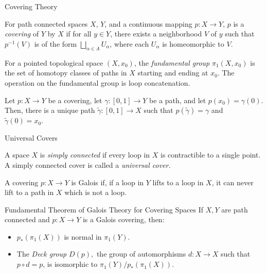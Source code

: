 \documentclass{beamer}
\begin{document}
\section{}
\begin{frame}{Covering Theory}
\begin{definition}[Covering]
For path connected spaces $X$, $Y$, and a continuous mapping $p:X\to Y$, $p$ is a \textit{covering} of $Y$ by $X$ if for all $y\in Y$, there exists a neighborhood $V$ of $y$ such that $p^{-1}(V)$ is of the form $\bigsqcup_{\alpha\in A} U_\alpha$, where each $U_\alpha$ is homeomorphic to $V.$  
\end{definition}
\begin{definition}
For a pointed topological space $(X, x_0)$, the \textit{fundamental group} $\pi_1(X, x_0)$ is the set of homotopy classes of paths in $X$ starting and ending at $x_0$. The operation on the fundamental group is loop concatenation. 
\end{definition}
\begin{theorem}
Let $p:X\to Y$ be a covering, let $\gamma: [0, 1]\to Y$ be a path, and let $p(x_0)=\gamma(0).$ Then, there is a unique path $\tilde{\gamma}: [0, 1]\to X$ such that $p(\tilde{\gamma})=\gamma$ and $\tilde{\gamma}(0)=x_0.$
\end{theorem}


    
\end{frame}
\begin{frame}{Universal Covers}
\begin{definitions}
A space $X$ is \textit{simply connected} if every loop in $X$ is contractible to a single point. A simply connected cover is called a \textit{universal cover.}
\end{definitions}
\begin{definition}
A covering $p:X\to Y$ is Galois if, if a loop in $Y$ lifts to a loop in $X$, it can never lift to a path in $X$ which is not a loop.
\end{definition}
\begin{block}{Fundamental Theorem of Galois Theory for Covering Spaces}
    If $X, Y$ are path connected and $p:X\to Y$ is a Galois covering, then:
    \begin{itemize}
        \item $p_*(\pi_1(X))$ is normal in $\pi_1(Y)$.
        \item The \textit{Deck group} $D(p),$ the group of automorphisms $d:X\to X$ such that $p\circ d=p$, is isomorphic to $\pi_1(Y)/p_*(\pi_1(X))$.
    \end{itemize}
\end{block}
\end{frame}
\end{document}
